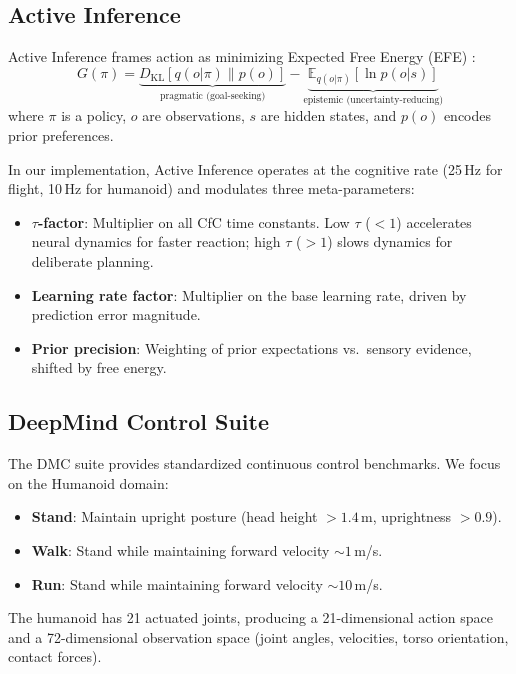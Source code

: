 \documentclass[11pt,a4paper]{article}
\begin{document}
\subsection{Active Inference}

Active Inference frames action as minimizing Expected Free Energy (EFE) \citep{friston2017active}:
\[
G(\pi) = \underbrace{D_{\mathrm{KL}}[q(o|\pi) \| p(o)]}_{\text{pragmatic (goal-seeking)}} - \underbrace{\mathbb{E}_{q(o|\pi)}[\ln p(o|s)]}_{\text{epistemic (uncertainty-reducing)}}
\]
where $\pi$ is a policy, $o$ are observations, $s$ are hidden states, and $p(o)$ encodes prior preferences.

In our implementation, Active Inference operates at the cognitive rate (25\,Hz for flight, 10\,Hz for humanoid) and modulates three meta-parameters:
\begin{itemize}
  \item \textbf{$\tau$-factor}: Multiplier on all CfC time constants. Low $\tau$ ($<1$) accelerates neural dynamics for faster reaction; high $\tau$ ($>1$) slows dynamics for deliberate planning.
  \item \textbf{Learning rate factor}: Multiplier on the base learning rate, driven by prediction error magnitude.
  \item \textbf{Prior precision}: Weighting of prior expectations vs.\ sensory evidence, shifted by free energy.
\end{itemize}

\subsection{DeepMind Control Suite}

The DMC suite \citep{tassa2018deepmind} provides standardized continuous control benchmarks.
We focus on the Humanoid domain:
\begin{itemize}
  \item \textbf{Stand}: Maintain upright posture (head height $> 1.4$\,m, uprightness $> 0.9$).
  \item \textbf{Walk}: Stand while maintaining forward velocity $\sim 1$\,m/s.
  \item \textbf{Run}: Stand while maintaining forward velocity $\sim 10$\,m/s.
\end{itemize}

The humanoid has 21 actuated joints, producing a 21-dimensional action space and a 72-dimensional observation space (joint angles, velocities, torso orientation, contact forces).
\end{document}
